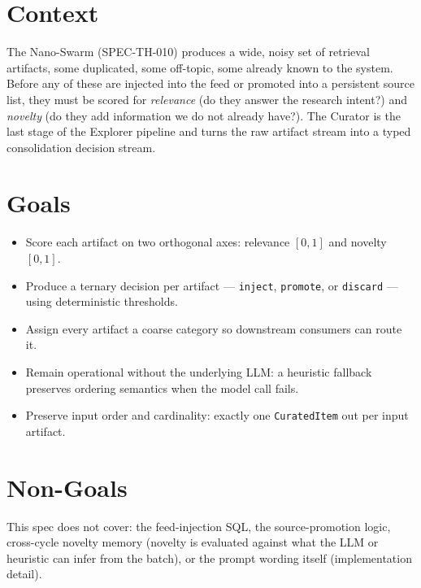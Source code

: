 



\makespecheader

\section{Context}
The Nano-Swarm (SPEC-TH-010) produces a wide, noisy set of retrieval artifacts, some duplicated,
some off-topic, some already known to the system. Before any of these are injected into the feed or
promoted into a persistent source list, they must be scored for \emph{relevance} (do they answer the
research intent?) and \emph{novelty} (do they add information we do not already have?). The Curator
is the last stage of the Explorer pipeline and turns the raw artifact stream into a typed
consolidation decision stream.

\section{Goals}
\begin{itemize}[leftmargin=1.2em]
  \item Score each artifact on two orthogonal axes: relevance \([0,1]\) and novelty \([0,1]\).
  \item Produce a ternary decision per artifact --- \texttt{inject}, \texttt{promote}, or \texttt{discard} --- using deterministic thresholds.
  \item Assign every artifact a coarse category so downstream consumers can route it.
  \item Remain operational without the underlying LLM: a heuristic fallback preserves ordering semantics when the model call fails.
  \item Preserve input order and cardinality: exactly one \texttt{CuratedItem} out per input artifact.
\end{itemize}

\section{Non-Goals}
\begin{nongoal}
This spec does not cover: the feed-injection SQL, the source-promotion logic, cross-cycle novelty
memory (novelty is evaluated against what the LLM or heuristic can infer from the batch), or the
prompt wording itself (implementation detail).
\end{nongoal}

